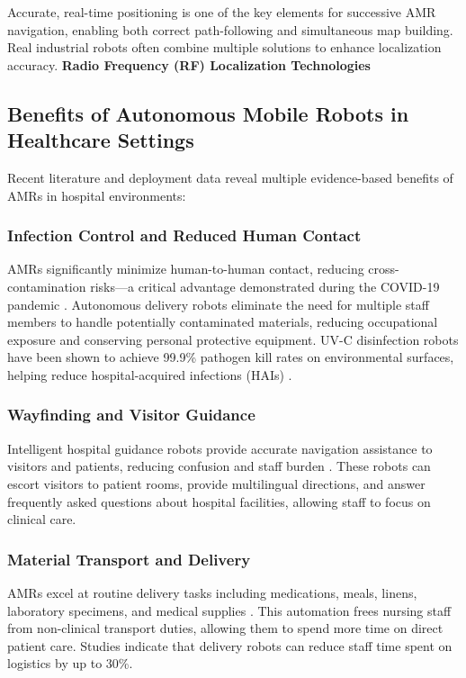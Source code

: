\documentclass[11pt,a4paper]{article}
\begin{document}
Accurate, real-time positioning is one of the key elements for successive AMR navigation, enabling both correct path-following and simultaneous map building. Real industrial robots often combine multiple solutions to enhance localization accuracy.
\textbf{Radio Frequency (RF) Localization Technologies}

\subsection{Benefits of Autonomous Mobile Robots in Healthcare Settings}

Recent literature and deployment data reveal multiple evidence-based benefits of AMRs in hospital environments:

\subsubsection{Infection Control and Reduced Human Contact}

AMRs significantly minimize human-to-human contact, reducing cross-contamination risks—a critical advantage demonstrated during the COVID-19 pandemic \cite{intel2024, frontiers2024}. Autonomous delivery robots eliminate the need for multiple staff members to handle potentially contaminated materials, reducing occupational exposure and conserving personal protective equipment. UV-C disinfection robots have been shown to achieve 99.9\% pathogen kill rates on environmental surfaces, helping reduce hospital-acquired infections (HAIs) \cite{sciencedirect2021}.

\subsubsection{Wayfinding and Visitor Guidance}

Intelligent hospital guidance robots provide accurate navigation assistance to visitors and patients, reducing confusion and staff burden \cite{pmc2024nursing}. These robots can escort visitors to patient rooms, provide multilingual directions, and answer frequently asked questions about hospital facilities, allowing staff to focus on clinical care.

\subsubsection{Material Transport and Delivery}

AMRs excel at routine delivery tasks including medications, meals, linens, laboratory specimens, and medical supplies \cite{mdpi2024}. This automation frees nursing staff from non-clinical transport duties, allowing them to spend more time on direct patient care. Studies indicate that delivery robots can reduce staff time spent on logistics by up to 30\%.
\end{document}
